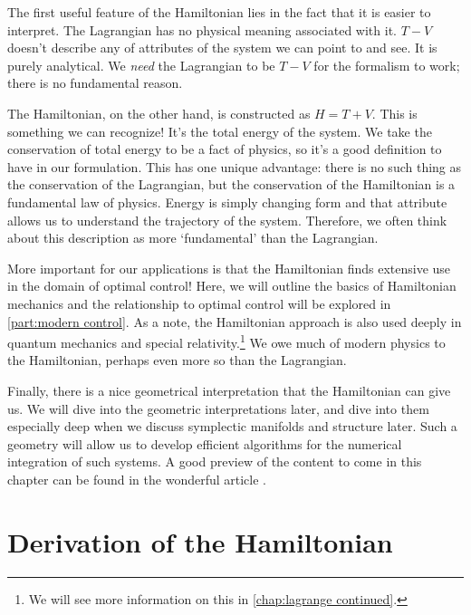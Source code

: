 The first useful feature of the \gls{Hamiltonian} lies in the fact that it is easier to interpret. The \gls{Lagrangian} has no physical meaning associated with it. $T-V$ doesn't describe any of attributes of the system we can point to and see. It is purely analytical. We \textit{need} the \gls{Lagrangian} to be $T-V$ for the formalism to work; there is no fundamental reason.

The \gls{Hamiltonian}, on the other hand, is constructed as $H=T+V$. This is something we can recognize! It's the total energy of the system. We take the conservation of total energy to be a fact of physics, so it's a good definition to have in our formulation. This has one unique advantage: there is no such thing as the conservation of the \gls{Lagrangian}, but the conservation of the \gls{Hamiltonian} is a fundamental law of physics. Energy is simply changing form and that attribute allows us to understand the trajectory of the system. Therefore, we often think about this description as more `fundamental' than the \gls{Lagrangian}. 

More important for our applications is that the \gls{Hamiltonian} finds extensive use in the domain of optimal control! Here, we will outline the basics of \gls{Hamiltonian} mechanics and the relationship to optimal control will be explored in \autoref{part:modern control}. As a note, the \gls{Hamiltonian} approach is also used deeply in quantum mechanics and special relativity.\footnote{We will see more information on this in \autoref{chap:lagrange continued}.} We owe much of modern physics to the \gls{Hamiltonian}, perhaps even more so than the \gls{Lagrangian}.

Finally, there is a nice geometrical interpretation that the \gls{Hamiltonian} can give us. We will dive into the geometric interpretations later, and dive into them especially deep when we discuss symplectic manifolds and structure later. Such a geometry will allow us to develop efficient algorithms for the numerical integration of such systems. A good preview of the content to come in this chapter can be found in the wonderful article \cite{hirvonen_hamiltonian_nodate}.

\section{Derivation of the Hamiltonian}

